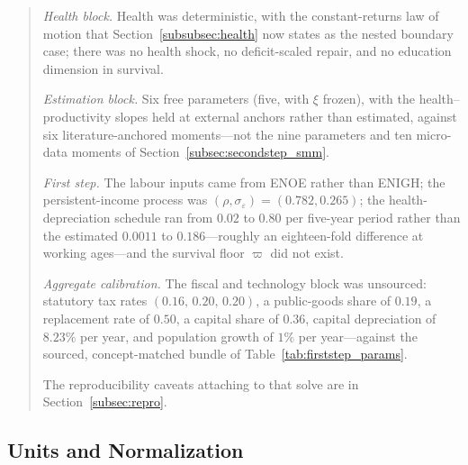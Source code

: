 \documentclass[12pt,a4paper]{article}
\begin{document}
\begin{quote}
\emph{Health block.} Health was deterministic, with the constant-returns law of motion that Section~\ref{subsubsec:health} now states as the nested boundary case; there was no health shock, no deficit-scaled repair, and no education dimension in survival.

\emph{Estimation block.} Six free parameters (five, with $\xi$ frozen), with the health--productivity slopes held at external anchors rather than estimated, against six literature-anchored moments---not the nine parameters and ten micro-data moments of Section~\ref{subsec:secondstep_smm}.

\emph{First step.} The labour inputs came from ENOE rather than ENIGH; the persistent-income process was $(\rho,\sigma_\varepsilon)=(0.782,0.265)$; the health-depreciation schedule ran from $0.02$ to $0.80$ per five-year period rather than the estimated $0.0011$ to $0.186$---roughly an eighteen-fold difference at working ages---and the survival floor $\varpi$ did not exist.

\emph{Aggregate calibration.} The fiscal and technology block was unsourced: statutory tax rates $(0.16,\,0.20,\,0.20)$, a public-goods share of $0.19$, a replacement rate of $0.50$, a capital share of $0.36$, capital depreciation of $8.23\%$ per year, and population growth of $1\%$ per year---against the sourced, concept-matched bundle of Table~\ref{tab:firststep_params}.

\noindent The reproducibility caveats attaching to that solve are in Section~\ref{subsec:repro}.
\end{quote}

\subsection{Units and Normalization}
\label{subsec:units}
\end{document}
